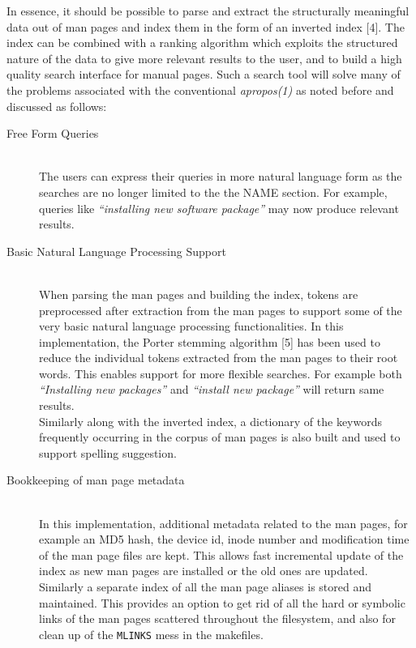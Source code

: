 \documentclass[letterpaper,twocolumn,10pt]{article}
\begin{document}
In essence, it should be possible
to parse and extract the structurally meaningful data
out of man pages and index them in the form of an inverted index [4]. The index
can be combined with a ranking algorithm which exploits the structured nature of
the
data to give more relevant results to the user, and to build a
high quality search interface for manual pages.
Such a search tool will solve many of the problems associated with the conventional \textit{apropos(1)} as noted
before and discussed as follows: \\

\begin{description}
\item[Free Form Queries] \hfill \\
The users can express their queries in more natural language form as the searches
are no longer limited to the the NAME section.
For example, queries like \textit{``installing new software package''} may
now produce relevant results.
\end{description}
\begin{description}
\item[Basic Natural Language Processing Support] \hfill \\
When parsing the man pages and building the index, tokens are preprocessed after
extraction from the man pages to support some of the very
basic natural language processing functionalities. In this implementation, the
Porter stemming algorithm [5] has been used to
reduce the individual tokens extracted from the man pages to their root words.
This enables support for more flexible searches. For example both
\textit{``Installing new packages''} and \textit{``install new package''} will
return same results. \\

Similarly along with the inverted index, a dictionary of the keywords frequently
occurring in the corpus of man pages is also built and used to support
spelling suggestion.
\end{description}
\begin{description}
\item[Bookkeeping of man page metadata] \hfill \\
In this implementation, additional metadata related to the man pages, for example
an MD5 hash, the device id, inode number and modification time
of the man page files are kept.
This allows fast incremental update of the index as new man pages are installed or the old ones are updated. \\

Similarly a separate index of all the man page aliases is stored and maintained.
This provides an option to get rid of all the hard or symbolic links of the man
pages scattered throughout the filesystem, and also for clean up of the
{\tt MLINKS} mess in the makefiles.
\end{description}
\end{document}
